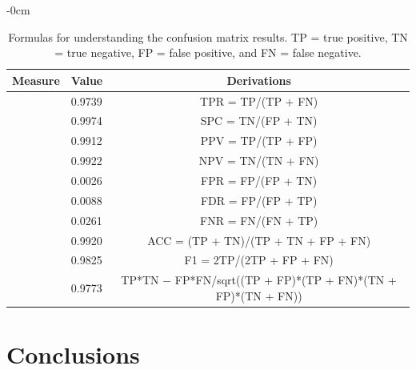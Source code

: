 \documentclass[remotesensing,article,accept,pdftex,moreauthors]{Definitions/mdpi}
\begin{document}
\vspace{-12pt}
\begin{table}[H]
\caption{Formulas %
 for understanding the confusion matrix results. TP = true positive, TN = true negative, FP = false positive, and FN = false negative.}
\label{tab2}
\begin{adjustwidth}{-\extralength}{0cm}
		\begin{tabularx}{\fulllength}{CCc}
\toprule
 \textbf{Measure} & \textbf{Value} & \textbf{Derivations}  \\ 
\midrule
{} & 0.9739 & TPR = TP/(TP + FN) \\
\midrule
{} & 0.9974 & SPC = TN/(FP + TN)  \\
\midrule
{} & 0.9912 & PPV = TP/(TP + FP)   \\
\midrule
{} & 0.9922 & NPV = TN/(TN + FN)   \\
\midrule
{} & 0.0026 & FPR = FP/(FP + TN) \\
\midrule
{} & 0.0088 & FDR = FP/(FP + TP) \\
\midrule
{} & 0.0261 & FNR = FN/(FN + TP) \\
\midrule
{} & 0.9920 & ACC = (TP + TN)/(TP + TN + FP + FN) \\
\midrule
{} & 0.9825 & F1 = 2TP/(2TP + FP + FN) \\
\midrule
{} & 0.9773 & TP*TN %
 $-$ FP*FN/sqrt((TP + FP)*(TP + FN)*(TN + FP)*(TN + FN)) \\
\bottomrule
\end{tabularx}
	\end{adjustwidth}
\end{table}


\section{Conclusions}
\end{document}
